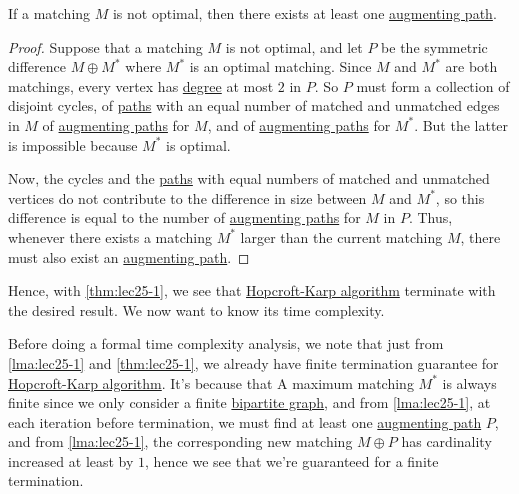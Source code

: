 \begin{theorem}\label{thm:lec25-1}
	If a matching \(M\) is not optimal, then there exists at least one \hyperref[def:augmenting-path]{augmenting path}.
\end{theorem}
\begin{proof}
	Suppose that a matching \(M\) is not optimal, and let \(P\) be the symmetric difference \(M\oplus M^{\ast} \) where \(M^{\ast} \) is an optimal
	matching. Since \(M\) and \(M^{\ast} \) are both matchings, every vertex has \hyperref[def:degree]{degree} at most \(2\) in \(P\). So \(P\)
	must form a collection of disjoint cycles, of \hyperref[def:path]{paths} with an equal number of matched and unmatched edges in \(M\) of
	\hyperref[def:augmenting-path]{augmenting paths} for \(M\), and of \hyperref[def:augmenting-path]{augmenting paths} for \(M^{\ast} \).
	But the latter is impossible because \(M^{\ast} \) is optimal.

	Now, the cycles and the \hyperref[def:path]{paths} with equal numbers of matched and unmatched vertices do not contribute to the difference in
	size between \(M\) and \(M^{\ast} \), so this difference is equal to the number of \hyperref[def:augmenting-path]{augmenting paths} for \(M\)
	in \(P\). Thus, whenever there exists a matching \(M^{\ast} \) larger than the current matching \(M\), there must also exist an
	\hyperref[def:augmenting-path]{augmenting path}.
\end{proof}

Hence, with \autoref{thm:lec25-1}, we see that \hyperref[algo:Hopcroft-Karp-algorithm]{Hopcroft-Karp algorithm} terminate with the desired
result. We now want to know its time complexity.
\begin{remark}
	Before doing a formal time complexity analysis, we note that just from \autoref{lma:lec25-1} and \autoref{thm:lec25-1}, we already have
	finite termination guarantee for \hyperref[algo:Hopcroft-Karp-algorithm]{Hopcroft-Karp algorithm}. It's because that A maximum
	matching \(M^{\ast} \) is always finite since we only consider a finite \href{https://en.wikipedia.org/wiki/Bipartite_graph}{bipartite graph},
	and from \autoref{lma:lec25-1}, at each iteration before termination, we must find at least one \hyperref[def:augmenting-path]{augmenting path} \(P\),
	and from \autoref{lma:lec25-1}, the corresponding new matching \(M\oplus P\) has cardinality increased at least by \(1\), hence we see that
	we're guaranteed for a finite termination.
\end{remark}

